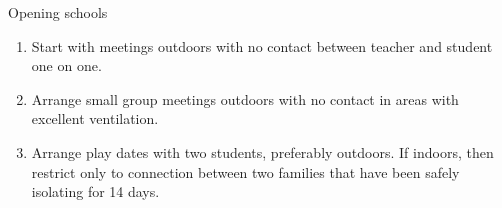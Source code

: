 \documentclass[onecolumn,journal]{IEEEtran}
\begin{document}
\begin{multicols}{2}
Opening schools
\begin{enumerate}
\item Start with meetings outdoors with no contact between teacher and student one on one.
\item Arrange small group meetings outdoors with no contact in areas with excellent ventilation.
\item Arrange play dates with two students, preferably outdoors. If indoors, then restrict only to connection between two families that have been safely isolating for 14 days. 
\end{enumerate}

\end{multicols}




% 
\end{document}
